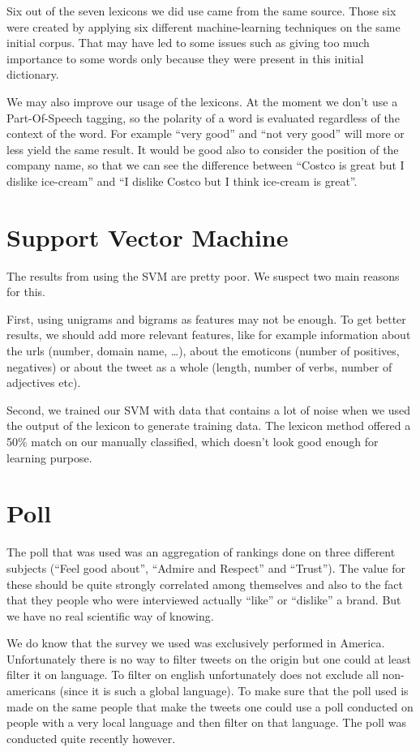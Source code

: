 \documentclass[a4paper,12pt]{report}
\begin{document}
Six out of the seven lexicons we did use came from the same source. Those six were created by applying six different machine-learning techniques on the same initial corpus. That may have led to some issues such as giving too much importance to some words only because they were present in this initial dictionary.

We may also improve our usage of the lexicons. At the moment we don't use a Part-Of-Speech tagging, so the polarity of a word is evaluated regardless of the context of the word. For example ``very good'' and ``not very good'' will more or less yield the same result. It would be good also to consider the position of the company name, so that we can see the difference between ``Costco is great but I dislike ice-cream'' and ``I dislike Costco but I think ice-cream is great''.

\section{Support Vector Machine}

The results from using the SVM are pretty poor. We suspect two main reasons for this.

First, using unigrams and bigrams as features may not be enough. To get better results, we should add more relevant features, like for example information about the urls (number, domain name, …), about the emoticons (number of positives, negatives) or about the tweet as a whole (length, number of verbs, number of adjectives etc).

Second, we trained our SVM with data that contains a lot of noise when we used the output of the lexicon to generate training data. The lexicon method offered a 50\% match on our manually classified, which doesn’t look good enough for learning purpose.

\section{Poll}

The poll that was used was an aggregation of rankings done on three different subjects (“Feel good about”, “Admire and Respect” and “Trust”). The value for these should be quite strongly correlated among themselves and also to the fact that they people who were interviewed actually “like” or “dislike” a brand. But we have no real scientific way of knowing.

We do know that the survey we used was exclusively performed in America. Unfortunately there is no way to filter tweets on the origin but one could at least filter it on language. To filter on english unfortunately does not exclude all non-americans (since it is such a global language). To make sure that the poll used is made on the same people that make the tweets one could use a poll conducted on people with a very local language and then filter on that language. The poll was conducted quite recently however.
\end{document}
